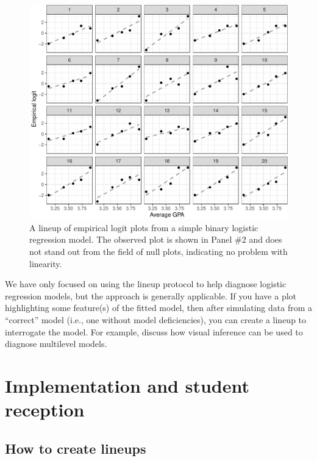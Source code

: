 \documentclass[12pt]{article}
\begin{document}
\begin{figure}
\centering
\includegraphics{figs/unnamed-chunk-8-1.pdf}
\caption{\label{fig:emplogitlineup} A lineup of empirical logit plots
from a simple binary logistic regression model. The observed plot is
shown in Panel \#2 and does not stand out from the field of null plots,
indicating no problem with linearity.}
\end{figure}

We have only focused on using the lineup protocol to help diagnose
logistic regression models, but the approach is generally applicable. If
you have a plot highlighting some feature(s) of the fitted model, then
after simulating data from a ``correct'' model (i.e., one without model
deficiencies), you can create a lineup to interrogate the model. For
example, \cite{Loy2017-fo} discuss how visual inference can be used to
diagnose multilevel models.

\clearpage

\hypertarget{implementation-and-student-reception}{%
\section{Implementation and student
reception}\label{implementation-and-student-reception}}

\label{sec:implement}

\hypertarget{how-to-create-lineups}{%
\subsection{How to create lineups}\label{how-to-create-lineups}}
\end{document}
